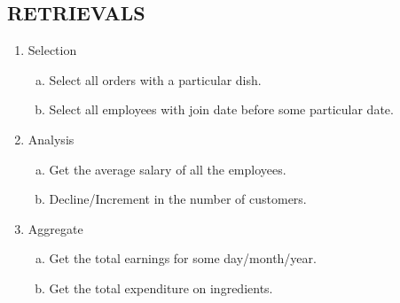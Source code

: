 \subsection{RETRIEVALS}
    \begin{enumerate}
        \item Selection
        \begin{enumerate}[(a)]
            \item Select all orders with a particular dish.
            \item Select all employees with join date before some particular date.
        \end{enumerate}
        \item Analysis
        \begin{enumerate}[(a)]
            \item Get the average salary of all the employees.
            \item Decline/Increment in the number of customers.
        \end{enumerate}
        \item Aggregate
        \begin{enumerate}[(a)]
            \item Get the total earnings for some day/month/year.
            \item Get the total expenditure on ingredients.
        \end{enumerate}
        
    \end{enumerate}